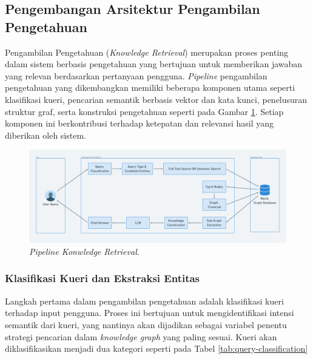 \subsection{Pengembangan Arsitektur Pengambilan Pengetahuan}
Pengambilan Pengetahuan (\textit{Knowledge Retrieval}) merupakan proses penting dalam sistem berbasis pengetahuan yang bertujuan untuk memberikan jawaban yang relevan berdasarkan pertanyaan pengguna.
\textit{Pipeline} pengambilan pengetahuan yang dikembangkan memiliki beberapa komponen utama seperti klasifikasi kueri, pencarian semantik berbasis vektor dan kata kunci, penelusuran struktur graf, serta konstruksi pengetahuan seperti pada Gambar \ref{fig:knowledge-retrieval-pipeline}.
Setiap komponen ini berkontribusi terhadap ketepatan dan relevansi hasil yang diberikan oleh sistem.

\begin{figure}[h]
	\includegraphics[width=1\textwidth]{images/knowledge-retrieval-pipeline.png}
	\caption{\textit{Pipeline Konwledge Retrieval}.}
	\label{fig:knowledge-retrieval-pipeline}
\end{figure}

\subsubsection{Klasifikasi Kueri dan Ekstraksi Entitas}
Langkah pertama dalam pengambilan pengetahuan adalah klasifikasi kueri terhadap input pengguna.
Proses ini bertujuan untuk mengidentifikasi intensi semantik dari kueri, yang nantinya akan dijadikan sebagai variabel penentu strategi pencarian dalam \textit{knowledge graph} yang paling sesuai.
Kueri akan diklasifikasikan menjadi dua kategori seperti pada Tabel \ref{tab:query-classification}

